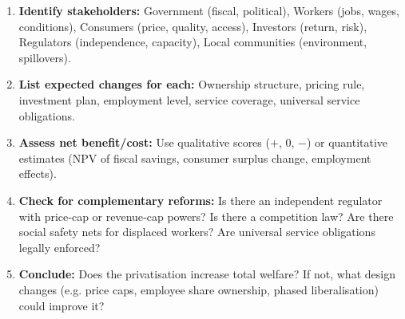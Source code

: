 \documentclass[11pt]{article}
\begin{document}
\begin{methode}
\begin{enumerate}
    \item \textbf{Identify stakeholders:} Government (fiscal, political), Workers (jobs, wages, conditions), Consumers (price, quality, access), Investors (return, risk), Regulators (independence, capacity), Local communities (environment, spillovers).
    \item \textbf{List expected changes for each:} Ownership structure, pricing rule, investment plan, employment level, service coverage, universal service obligations.
    \item \textbf{Assess net benefit/cost:} Use qualitative scores ($+$, $0$, $-$) or quantitative estimates (NPV of fiscal savings, consumer surplus change, employment effects).
    \item \textbf{Check for complementary reforms:} Is there an independent regulator with price‑cap or revenue‑cap powers? Is there a competition law? Are there social safety nets for displaced workers? Are universal service obligations legally enforced?
    \item \textbf{Conclude:} Does the privatisation increase total welfare?  If not, what design changes (e.g. price caps, employee share ownership, phased liberalisation) could improve it?
\end{enumerate}
\end{methode}
\end{document}
